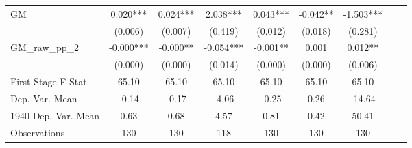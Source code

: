 \begin{tabular}{l*{8}{c}}
GM              &    0.020***&    0.024***&    2.038***&    0.043***&   -0.042** &   -1.503***\\
                &  (0.006)   &  (0.007)   &  (0.419)   &  (0.012)   &  (0.018)   &  (0.281)   \\
\addlinespace
GM\_raw\_pp\_2     &   -0.000***&   -0.000** &   -0.054***&   -0.001** &    0.001   &    0.012** \\
                &  (0.000)   &  (0.000)   &  (0.014)   &  (0.000)   &  (0.000)   &  (0.006)   \\
\midrule
First Stage F-Stat&    65.10   &    65.10   &    65.10   &    65.10   &    65.10   &    65.10   \\
Dep. Var. Mean  &    -0.14   &    -0.17   &    -4.06   &    -0.25   &     0.26   &   -14.64   \\
1940 Dep. Var. Mean&     0.63   &     0.68   &     4.57   &     0.81   &     0.42   &    50.41   \\
Observations    &      130   &      130   &      118   &      130   &      130   &      130   \\
 \bottomrule \end{tabular}
